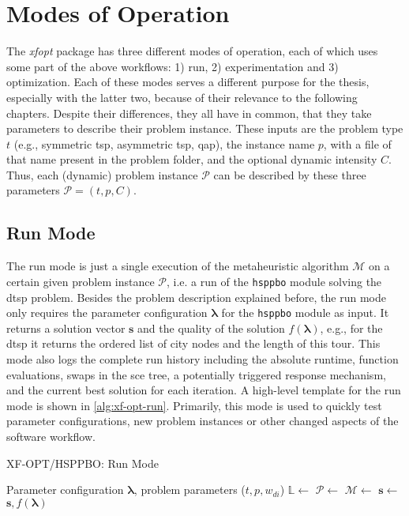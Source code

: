 \section{Modes of Operation}
\label{chap:mop}

The \textit{\gls{xfopt}} package has three different modes of operation, each of which uses some part of the above workflows: 1) run, 2) experimentation and 3) optimization. Each of these modes serves a different purpose for the thesis, especially with the latter two, because of their relevance to the following chapters.
Despite their differences, they all have in common, that they take parameters to describe their problem instance. These inputs are the problem type $t$ (e.g., symmetric \gls{tsp}, asymmetric \gls{tsp}, \gls{qap}), the instance name $p$, with a file of that name present in the problem folder, and the optional dynamic intensity $C$. Thus, each (dynamic) problem instance $\mathcal{P}$ can be described by these three parameters $\mathcal{P} = \left( t,p,C \right)$.

\subsection{Run Mode}
The run mode is just a single execution of the metaheuristic algorithm $\mathcal{M}$ on a certain given problem instance $\mathcal{P}$, i.e. a run of the \texttt{hsppbo} module solving the \gls{dtsp} problem. Besides the problem description explained before, the run mode only requires the parameter configuration $\mathbf{\lambda}$ for the \texttt{hsppbo} module as input. It returns a solution vector $\mathbf{s}$ and the quality of the solution $f(\mathbf{\lambda})$, e.g., for the \gls{dtsp} it returns the ordered list of city nodes and the length of this tour. This mode also logs the complete run history including the absolute runtime, function evaluations, swaps in the \gls{sce} tree, a potentially triggered response mechanism, and the current best solution for each iteration. 
A high-level template for the run mode is shown in \cref{alg:xf-opt-run}.
Primarily, this mode is used to quickly test parameter configurations, new problem instances or other changed aspects of the software workflow.

\begin{algorithm}
	\caption{XF-OPT/HSPPBO: Run Mode}
	\label{alg:xf-opt-run}
	\begin{algorithmic}
		\Require Parameter configuration $\mathbf{\lambda}$, problem parameters ($t, p, w_{di}$)
		\State $\mathbb{L}  \gets $  
		\State $\mathcal{P}  \gets $ 
		\State $\mathcal{M}  \gets $ 
		\State $\mathbf{s} \gets $ 
		\State {}
		\State \Return $\mathcal{\mathbf{s}}, f(\mathbf{\lambda})$
	\end{algorithmic}
\end{algorithm}


